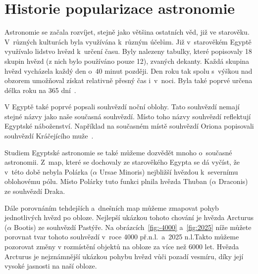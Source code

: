 \documentclass[12pt,a4paper,titlepage]{article}
\begin{document}
\section{Historie popularizace astronomie}
Astronomie se začala rozvíjet, stejně jako většina ostatních věd, již ve starověku. V~různých kulturách byla využívána k~různým účelům. Již v~starověkém Egyptě využívalo lidstvo hvězd k~určení času. Byly nalezeny tabulky, které popisovaly 18 skupin hvězd (z nich bylo používáno pouze 12), zvaných dekanty. Každá skupina hvězd vycházela každý den o~40 minut později. Den roku tak spolu s~výškou nad obzorem umožňoval získat relativně přesný čas i~v~noci. Byla také poprvé určena délka roku na 365 dní~. 

V Egyptě také poprvé popsali souhvězdí noční oblohy. Tato souhvězdí nemají stejné názvy jako naše současná souhvězdí. Místo toho názvy souhvězdí reflektují Egyptské náboženství. Například na současném místě souhvězdí Oriona popisovali souhvězdí Kráčejícího muže~.

Studiem Egyptské astronomie se také můžeme dozvědět mnoho o~současné astronomii. Z~map, které se dochovaly ze starověkého Egypta se dá vyčíst, že v~této době nebyla Polárka ($\alpha$ Ursae Minoris) nejbližší hvězdou k~severnímu oblohovému pólu. Místo Polárky tuto funkci plnila hvězda Thuban ($\alpha$ Draconis) ze souhvězdí Draka. 

Dále porovnáním tehdejších a~dnešních map můžeme zmapovat pohyb jednotlivých hvězd po obloze. Nejlepší ukázkou tohoto chování je hvězda Arcturus ($\alpha$ Bootis) ze souhvězdí Pastýře. Na obrázcích~\ref{fig:-4000} a~\ref{fig:2025} níže můžete porovnat tvar tohoto souhvězdí v~roce 4000 př.n.l.\ a~2025 n.l.\@ Takto můžeme pozorovat změny v rozmístění objektů na obloze za více než 6000 let. Hvězda Arcturus je nejznámnější ukázkou pohybu hvězd vůči pozadí vesmíru, díky její vysoké jasnosti na naší obloze.
\end{document}
